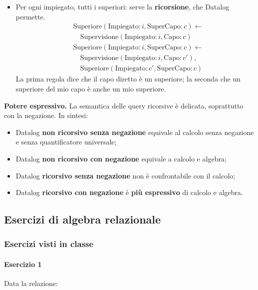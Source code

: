 \documentclass[12pt]{extarticle}
\begin{document}
\begin{itemize}
    \item Per ogni impiegato, tutti i superiori: serve la \textbf{ricorsione}, che Datalog permette.
    \[\begin{aligned}     & \text{Superiore}(\text{Impiegato}: i, \text{SuperCapo}: c) \leftarrow \\     & \quad \text{Supervisione}(\text{Impiegato}: i, \text{Capo}: c) \\     & \text{Superiore}(\text{Impiegato}: i, \text{SuperCapo}: c) \leftarrow \\     & \quad \text{Supervisione}(\text{Impiegato}: i, \text{Capo}: c'), \\     & \quad \text{Superiore}(\text{Impiegato}: c', \text{SuperCapo}: c)     \end{aligned}\]
    La prima regola dice che il capo diretto è un superiore; la seconda che un superiore del mio capo è anche un mio superiore.
\end{itemize}

\noindent \textbf{Potere espressivo.} La semantica delle query ricorsive è delicata, soprattutto con la negazione. In sintesi:
\begin{itemize}
    \item Datalog \textbf{non ricorsivo senza negazione} equivale al calcolo senza negazione e senza quantificatore universale;
    \item Datalog \textbf{non ricorsivo con negazione} equivale a calcolo e algebra;
    \item Datalog \textbf{ricorsivo senza negazione} non è confrontabile con il calcolo;
    \item Datalog \textbf{ricorsivo con negazione} è \textbf{più espressivo} di calcolo e algebra.
\end{itemize}

\subsection{Esercizi di algebra relazionale}

\subsubsection{Esercizi visti in classe}

\paragraph{Esercizio 1} Data la relazione:\\
\end{document}
